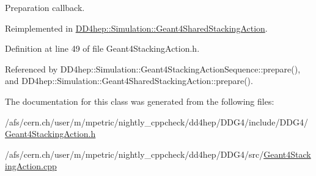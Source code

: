Preparation callback. 

Reimplemented in \hyperlink{class_d_d4hep_1_1_simulation_1_1_geant4_shared_stacking_action_a22e3516dfed160da7a3b246d28098891}{DD4hep::Simulation::Geant4SharedStackingAction}.

Definition at line 49 of file Geant4StackingAction.h.

Referenced by DD4hep::Simulation::Geant4StackingActionSequence::prepare(), and DD4hep::Simulation::Geant4SharedStackingAction::prepare().

The documentation for this class was generated from the following files:\begin{DoxyCompactItemize}
\item 
/afs/cern.ch/user/m/mpetric/nightly\_\-cppcheck/dd4hep/DDG4/include/DDG4/\hyperlink{_geant4_stacking_action_8h}{Geant4StackingAction.h}\item 
/afs/cern.ch/user/m/mpetric/nightly\_\-cppcheck/dd4hep/DDG4/src/\hyperlink{_geant4_stacking_action_8cpp}{Geant4StackingAction.cpp}\end{DoxyCompactItemize}
